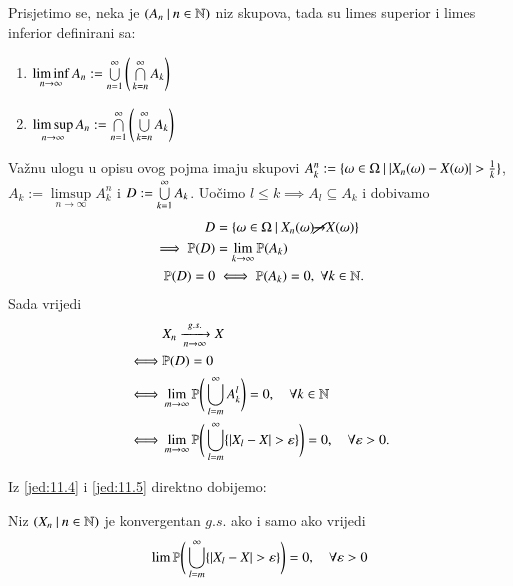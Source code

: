\begin{nap} \label{nap:11.4-1}
    Prisjetimo se, neka je $({A_n} \: | \: {n \in \mathbb{N}})$ niz skupova, tada su limes superior i limes inferior definirani sa:
    \begin{enumerate}[label=(\roman*)]
        \item $\liminf\limits_{n \to \infty} A_n := \bigcup\limits_{n = 1}^{\infty} \Bigg( \bigcap\limits_{k = n}^{\infty} A_k \Bigg)$
        \item $\limsup\limits_{n \to \infty} A_n := \bigcap\limits_{n = 1}^{\infty} \Bigg( \bigcup\limits_{k = n}^{\infty} A_k \Bigg)$
    \end{enumerate}
\end{nap}

Va\v znu ulogu u opisu ovog pojma imaju skupovi $A_k^n := \{{\omega \in \Omega} \: | \: {|X_n(\omega) - X(\omega)| > \frac{1}{k}}\}$, $A_k := \limsup\limits_{n \to \infty} A_k^n$ i $D := \bigcup\limits_{k = 1}^{\infty} A_k$.
Uo\v cimo $l \leq k \implies A_l \subseteq A_k$ i dobivamo
\begin{equation*}
    \begin{aligned}
        D &= \{{\omega \in \Omega} \: | \: {X_n(\omega) \cancel{\xrightarrow{}}X(\omega)}\}\\
        \implies  \mathbb{P}({D}) &= \lim\limits_{k \to \infty} \mathbb{P}({A_k})\\
        \mathbb{P}({D}) = 0 &\iff \mathbb{P}({A_k}) = 0, \; \forall k \in \mathbb{N}.
    \end{aligned}
\end{equation*}
Sada vrijedi
\begin{equation}    \label{jed:11.5}
    \begin{aligned}
        &X_n \xrightarrow[n \to \infty]{g.s.} X\\
        \iff &\mathbb{P}({D}) = 0\\
        \iff &\lim\limits_{m \to \infty} \mathbb{P} \Bigg( \bigcup\limits_{l = m}^{\infty} A_k^l \Bigg) = 0, \quad \forall k \in \mathbb{N}\\
        \iff &\lim\limits_{m \to \infty} \mathbb{P} \Bigg( \bigcup\limits_{l = m}^{\infty} \{ |X_l - X| > \varepsilon \} \Bigg) = 0, \quad \forall \varepsilon > 0.
    \end{aligned}
\end{equation}

Iz \eqref{jed:11.4} i \eqref{jed:11.5} direktno dobijemo:

\begin{lm}  \label{lm:11.6}
    Niz $({X_n} \: | \: {n \in \mathbb{N}})$ je konvergentan $g.s.$ ako i samo ako vrijedi
    \begin{equation*}
        \lim\limits \mathbb{P} \Bigg( \bigcup\limits_{l = m}^{\infty} \{ |X_l - X| > \varepsilon \} \Bigg) = 0, \quad \forall \varepsilon > 0
    \end{equation*}
\end{lm}

